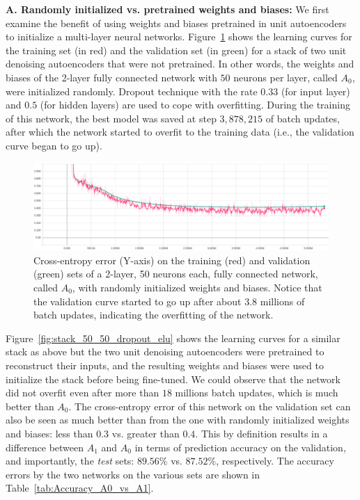 \documentclass[12pt]{article}
\begin{document}
\noindent
\textbf{A. Randomly initialized vs. pretrained weights and biases:} We first examine the benefit of using weights and biases pretrained in unit autoencoders to initialize a multi-layer neural networks. Figure~\ref{fig:nopretrained_50_50} shows the learning curves for the training set (in red) and the validation set (in green) for a stack of two unit denoising autoencoders that were not pretrained. In other words, the weights and biases of the 2-layer fully connected network with $50$ neurons per layer, called $A_0$, were initialized randomly. Dropout technique with the rate $0.33$ (for input layer) and $0.5$ (for hidden layers) are used to cope with overfitting. During the training of this network, the best model was saved at step $3,878,215$ of batch updates, after which the network started to overfit to the training data (i.e., the validation curve began to go up). 

\begin{figure}
  \includegraphics[width=\linewidth]{figures/nopretrained_50_50.eps}
  \caption{Cross-entropy error (Y-axis) on the training (red) and validation (green) sets of a 2-layer, 50 neurons each, fully connected network, called $A_0$, with randomly initialized weights and biases. Notice that the validation curve started to go up after about $3.8$ millions of batch updates, indicating the overfitting of the network.}
  \label{fig:nopretrained_50_50}
\end{figure}

Figure~\ref{fig:stack_50_50_dropout_elu} shows the learning curves for a similar stack as above but the two unit denoising autoencoders were pretrained to reconstruct their inputs, and the resulting weights and biases were used to initialize the stack before being fine-tuned. We could observe that the network did not overfit even after more than $18$ millions batch updates, which is much better than $A_0$. The cross-entropy error of this network on the validation set can also be seen as much better than from the one with randomly initialized weights and biases: less than $0.3$ vs. greater than $0.4$. This by definition results in a difference between $A_1$ and $A_0$ in terms of prediction accuracy on the validation, and importantly, the \emph{test} sets: $89.56\%$ vs. $87.52\%$, respectively. The accuracy errors by the two networks on the various sets are shown in Table~\ref{tab:Accuracy_A0_vs_A1}.
\end{document}
